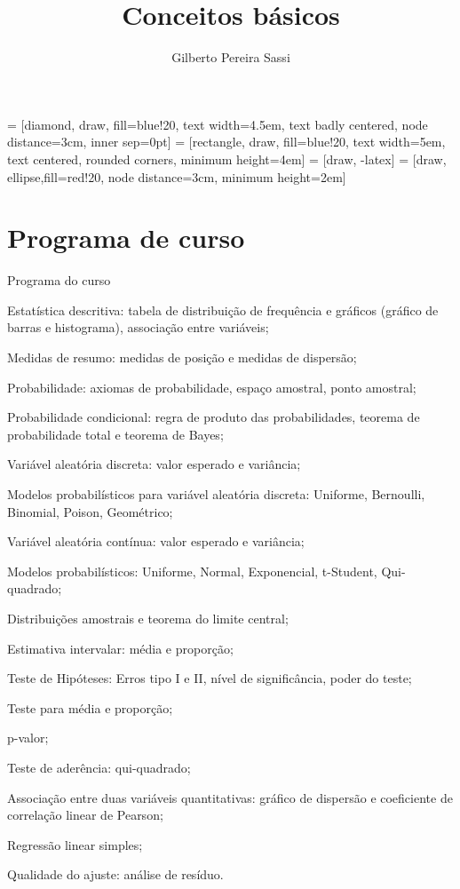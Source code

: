 \documentclass[9pt]{beamer}
\date{}
\title[Estatística Básica]{Conceitos básicos}
\author[Gilberto Sassi]{Gilberto Pereira Sassi}
\institute[IME -- UFBA]{Universidade Federal da Bahia \\ Instituto de Matem\'{a}tica e Estat\'{i}stica\\ Departamento de Estat\'{i}stica }
\begin{document}
	
 = [diamond, draw, fill=blue!20, 
text width=4.5em, text badly centered, node distance=3cm, inner sep=0pt]
 = [rectangle, draw, fill=blue!20, 
text width=5em, text centered, rounded corners, minimum height=4em]
 = [draw, -latex]
 = [draw, ellipse,fill=red!20, node distance=3cm,
minimum height=2em]
	
\begin{frame}{}
	\maketitle
\end{frame}

\section{Programa de curso}
\begin{frame}{Programa do curso}
 \begin{enumerate}
 {\small
  \item Estatística descritiva: tabela de distribuição de frequência e gráficos (gráfico de barras e histograma), associação entre variáveis;
  \item Medidas de resumo: medidas de posição e medidas de dispersão;
  \item Probabilidade: axiomas de probabilidade, espaço amostral, ponto amostral;
  \item Probabilidade condicional: regra de produto das probabilidades, teorema de probabilidade total e teorema de Bayes;
  \item Variável aleatória discreta: valor esperado e variância;
  \item Modelos probabilísticos para variável aleatória discreta: Uniforme, Bernoulli, Binomial, Poison, Geométrico;
  \item Variável aleatória contínua: valor esperado e variância;
  \item Modelos probabilísticos: Uniforme, Normal, Exponencial, t-Student, Qui-quadrado;
  \item Distribuições amostrais e teorema do limite central;
  \item Estimativa intervalar: média e proporção;
  \item Teste de Hipóteses: Erros tipo I e II, nível de significância, poder do teste;
  \item Teste para média e proporção;
  \item p-valor;
  \item Teste de aderência: qui-quadrado;
  \item Associação entre duas variáveis quantitativas: gráfico de dispersão e coeficiente de correlação linear de Pearson;
  \item Regressão linear simples;
  \item Qualidade do ajuste: análise de resíduo.
  }
 \end{enumerate}
\end{frame}
\end{document}
